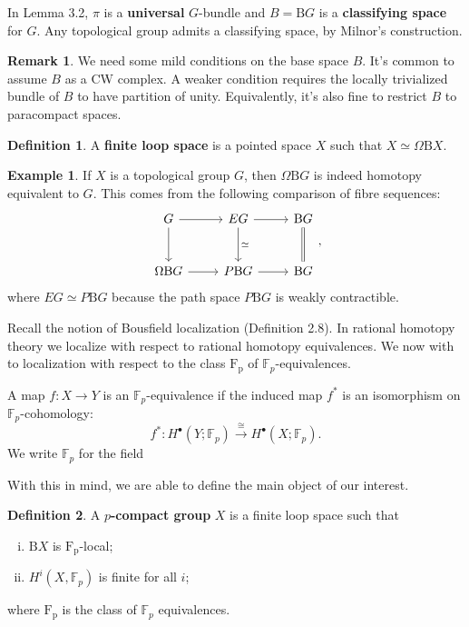 \documentclass[psamsfonts]{amsart}
\theoremstyle{definition}
\newtheorem{defn}{Definition}[section]
\newtheorem{exmp}{Example}[section]
\newtheorem{rem}{Remark}[section]
\newcommand{\F}{\mathbb{F}}
\newcommand{\B}{\mathrm{B}}
\numberwithin{equation}{section}
\begin{document}
In Lemma 3.2, $\pi$ is a \textbf{universal} $G$-bundle and $B=\B G$ is a \textbf{classifying space} for $G$. Any topological group admits a classifying space, by Milnor's construction.

\begin{rem}
We need some mild conditions on the base space $B$. It's common to assume $B$ as a CW complex. A weaker condition requires the locally trivialized bundle of $B$ to have partition of unity. Equivalently, it's also fine to restrict $B$ to paracompact spaces.
\end{rem}

\begin{defn}
A \textbf{finite loop space} is a pointed space $X$ such that $X\simeq\Omega\B X$.
\end{defn}

\begin{exmp}
If $X$ is a topological group $G$, then $\Omega\B G$ is indeed homotopy equivalent to $G$. This comes from the following comparison of fibre sequences:
\[\begin{tikzcd}[row sep=large]
G\arrow[r]\arrow[d]&EG\arrow[r]\arrow[d,"\simeq"]&\B G\arrow[d,equal]\\
\Omega\B G\arrow[r]&P\B G\arrow[r]&\B G
\end{tikzcd},\]
where $EG\simeq P\B G$ because the path space $P\B G$ is weakly contractible.
\end{exmp}

Recall the notion of Bousfield localization (Definition 2.8). In rational homotopy theory we localize with respect to rational homotopy equivalences. We now with to localization with respect to the class $\mathrm{F_p}$ of $\F_p$-equivalences.

A map $f:X\to Y$ is an $\F_p$-equivalence if the induced map $f^\ast$ is an isomorphism on $\F_p$-cohomology:
\[f^\ast:H^\bullet(Y;\F_p)\xrightarrow{\ \cong\ } H^\bullet(X;\F_p).\]
We write $\F_p$ for the field 
\bigbreak

With this in mind, we are able to define the main object of our interest.

\begin{defn}
A \textbf{$p$-compact group} $X$ is a finite loop space such that\begin{enumerate}[(i)]
    \item $\B X$ is $\mathrm{F_p}$-local;
    \item $H^i(X,\F_p)$ is finite for all $i$;
\end{enumerate}
where $\mathrm{F_p}$ is the class of $\F_p$ equivalences.
\end{defn}
\end{document}
